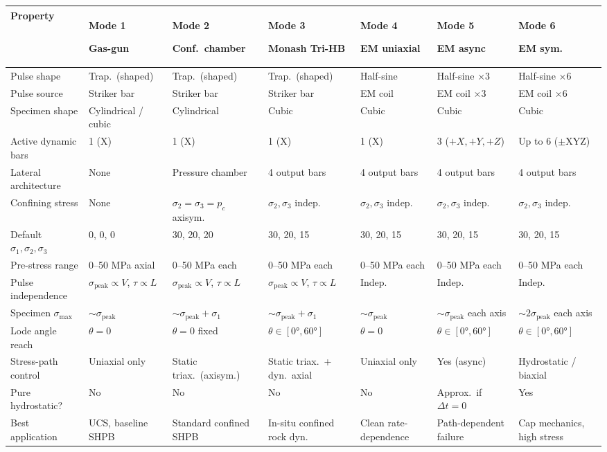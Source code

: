 \documentclass[11pt,a4paper,openany]{book}
\theoremstyle{handbook}
\newcommand{\sig}{\sigma}
\newcommand{\sigpeak}{\sig_{\text{peak}}}
\begin{document}
\begin{center}
\renewcommand{\arraystretch}{1.4}
\scriptsize
\begin{tabular}{@{}p{2.5cm}p{1.55cm}p{1.55cm}p{1.55cm}p{1.55cm}p{1.55cm}p{1.55cm}@{}}
\toprule
\textbf{Property} & \textbf{Mode 1} \par Gas-gun & \textbf{Mode 2} \par Conf.\ chamber & \textbf{Mode 3} \par Monash Tri-HB & \textbf{Mode 4} \par EM uniaxial & \textbf{Mode 5} \par EM async & \textbf{Mode 6} \par EM sym.\\
\midrule
Pulse shape & Trap.\ (shaped) & Trap.\ (shaped) & Trap.\ (shaped) & Half-sine & Half-sine $\times 3$ & Half-sine $\times 6$ \\
Pulse source & Striker bar & Striker bar & Striker bar & EM coil & EM coil $\times 3$ & EM coil $\times 6$ \\
Specimen shape & Cylindrical / cubic & Cylindrical & Cubic & Cubic & Cubic & Cubic \\
Active dynamic bars & 1 (X) & 1 (X) & 1 (X) & 1 (X) & 3 ($+X,+Y,+Z$) & Up to 6 ($\pm$XYZ) \\
Lateral architecture & None & Pressure chamber & 4 output bars & 4 output bars & 4 output bars & 4 output bars \\
Confining stress & None & $\sig_2{=}\sig_3{=}p_c$ axisym. & $\sig_2,\sig_3$ indep.\ & $\sig_2,\sig_3$ indep.\ & $\sig_2,\sig_3$ indep.\ & $\sig_2,\sig_3$ indep.\ \\
Default $\sig_1,\sig_2,\sig_3$ & 0, 0, 0 & 30, 20, 20 & 30, 20, 15 & 30, 20, 15 & 30, 20, 15 & 30, 20, 15 \\
Pre-stress range & 0--50 MPa axial & 0--50 MPa each & 0--50 MPa each & 0--50 MPa each & 0--50 MPa each & 0--50 MPa each \\
Pulse independence & $\sigpeak{\propto}V$, $\tau{\propto}L$ & $\sigpeak{\propto}V$, $\tau{\propto}L$ & $\sigpeak{\propto}V$, $\tau{\propto}L$ & Indep. & Indep. & Indep. \\
Specimen $\sig_{\max}$ & ${\sim}\sigpeak$ & ${\sim}\sigpeak{+}\sig_1$ & ${\sim}\sigpeak{+}\sig_1$ & ${\sim}\sigpeak$ & ${\sim}\sigpeak$ each axis & ${\sim}2\sigpeak$ each axis \\
Lode angle reach & $\theta=0$ & $\theta=0$ fixed & $\theta\in[0°,60°]$ & $\theta=0$ & $\theta\in[0°,60°]$ & $\theta\in[0°,60°]$ \\
Stress-path control & Uniaxial only & Static triax.\ (axisym.) & Static triax.\ + dyn.\ axial & Uniaxial only & Yes (async) & Hydrostatic / biaxial \\
Pure hydrostatic? & No & No & No & No & Approx.\ if $\Delta t{=}0$ & Yes \\
Best application & UCS, baseline SHPB & Standard confined SHPB & In-situ confined rock dyn. & Clean rate-dependence & Path-dependent failure & Cap mechanics, high stress \\
\bottomrule
\end{tabular}
\end{center}
\end{document}
